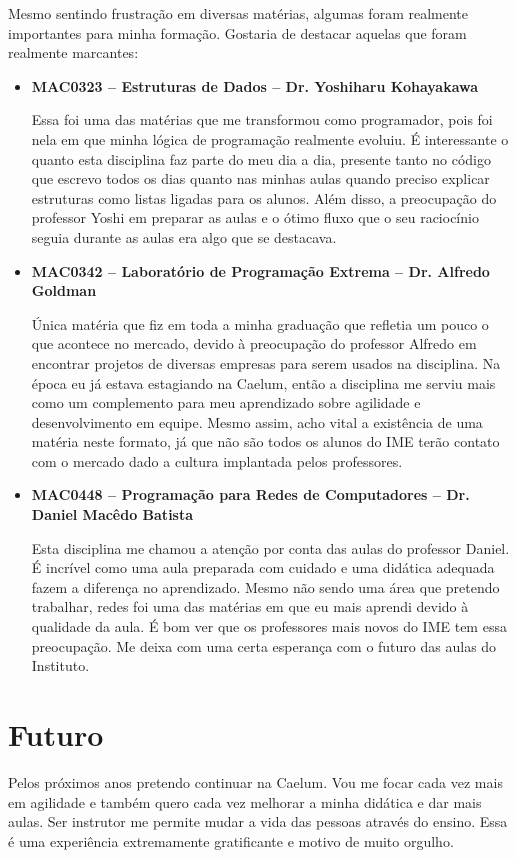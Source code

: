 \documentclass[titlepage,a4paper]{article}
\begin{document}
Mesmo sentindo frustração em diversas matérias, algumas foram realmente importantes para minha formação. Gostaria de destacar aquelas que foram realmente marcantes:

\begin{itemize}
	\item{\textbf{MAC0323 -- Estruturas de Dados -- Dr. Yoshiharu Kohayakawa} 

		Essa foi uma das matérias que me transformou como programador, pois foi nela em que minha lógica de programação realmente evoluiu. É interessante o quanto esta disciplina faz parte do meu dia a dia, presente tanto no código que escrevo todos os dias quanto nas minhas aulas quando preciso explicar estruturas como listas ligadas para os alunos. Além disso, a preocupação do professor Yoshi em preparar as aulas e o ótimo fluxo que o seu raciocínio seguia durante as aulas era algo que se destacava.}
	\item{\textbf{MAC0342 -- Laboratório de Programação Extrema -- Dr. Alfredo Goldman}

		Única matéria que fiz em toda a minha graduação que refletia um pouco o que acontece no mercado,  devido à preocupação do professor Alfredo em encontrar projetos de diversas empresas para serem usados na disciplina. Na época eu já estava estagiando na Caelum, então a disciplina me serviu mais como um complemento para meu aprendizado sobre agilidade e desenvolvimento em equipe. Mesmo assim, acho vital a existência de uma matéria neste formato, já que não são todos os alunos do IME terão contato com o mercado dado a cultura implantada pelos professores.}
	\item{\textbf{MAC0448 -- Programação para Redes de Computadores -- Dr. Daniel Macêdo Batista}

		Esta disciplina me chamou a atenção por conta das aulas do professor Daniel. É incrível como uma aula preparada com cuidado e uma didática adequada fazem a diferença no aprendizado. Mesmo não sendo uma área que pretendo trabalhar, redes foi uma das matérias em que eu mais aprendi devido à qualidade da aula. É bom ver que os professores mais novos do IME tem essa preocupação. Me deixa com uma certa esperança com o futuro das aulas do Instituto.}
\end{itemize}

\section{Futuro}

Pelos próximos anos pretendo continuar na Caelum. Vou me focar cada vez mais em agilidade e também quero cada vez melhorar a minha didática e dar mais aulas. Ser instrutor me permite mudar a vida das pessoas através do ensino. Essa é uma experiência extremamente gratificante e motivo de muito orgulho.
\end{document}
